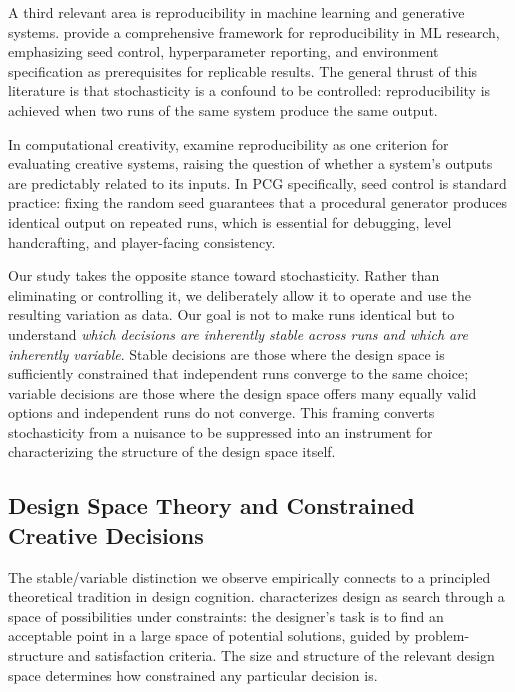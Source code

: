 A third relevant area is reproducibility in machine learning and generative systems. \citet{pineau2021improving} provide a comprehensive framework for reproducibility in ML research, emphasizing seed control, hyperparameter reporting, and environment specification as prerequisites for replicable results. The general thrust of this literature is that stochasticity is a confound to be controlled: reproducibility is achieved when two runs of the same system produce the same output.

In computational creativity, \citet{colton2011computational} examine reproducibility as one criterion for evaluating creative systems, raising the question of whether a system's outputs are predictably related to its inputs. In PCG specifically, seed control is standard practice: fixing the random seed guarantees that a procedural generator produces identical output on repeated runs, which is essential for debugging, level handcrafting, and player-facing consistency.

Our study takes the opposite stance toward stochasticity. Rather than eliminating or controlling it, we deliberately allow it to operate and use the resulting variation as data. Our goal is not to make runs identical but to understand \textit{which decisions are inherently stable across runs and which are inherently variable}. Stable decisions are those where the design space is sufficiently constrained that independent runs converge to the same choice; variable decisions are those where the design space offers many equally valid options and independent runs do not converge. This framing converts stochasticity from a nuisance to be suppressed into an instrument for characterizing the structure of the design space itself.

\subsection{Design Space Theory and Constrained Creative Decisions}

The stable/variable distinction we observe empirically connects to a principled theoretical tradition in design cognition. \citet{simon1969sciences} characterizes design as search through a space of possibilities under constraints: the designer's task is to find an acceptable point in a large space of potential solutions, guided by problem-structure and satisfaction criteria. The size and structure of the relevant design space determines how constrained any particular decision is.

